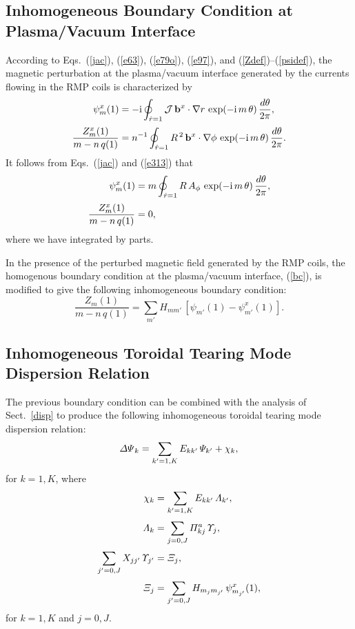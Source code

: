 \documentclass[12pt,prb,aps]{revtex4-1}
\begin{document}
\subsection{Inhomogeneous Boundary Condition at Plasma/Vacuum Interface}
According to Eqs.~(\ref{jac}), (\ref{e63}), (\ref{e79o}), (\ref{e97}), and (\ref{Zdef})--(\ref{psidef}), the magnetic perturbation at the plasma/vacuum
interface generated by the currents flowing in the RMP coils is characterized by
\begin{align}
\psi_m^x(1) &=-{\rm i}\oint_{\hat{r}=1}{\cal J}\,{\bf b}^x\cdot\nabla r\,\exp(-{\rm i}\,m\,\theta)\,\frac{d\theta}{2\pi},\\[0.5ex]
\frac{Z_m^x(1)}{m-n\,q(1)}  &= n^{-1}\oint_{\hat{r}=1}R^{\,2}\,{\bf b}^x\cdot\nabla \phi\,\exp(-{\rm i}\,m\,\theta)\,\frac{d\theta}{2\pi}.
\end{align}
It follows from Eqs.~(\ref{jac}) and (\ref{e313}) that
\begin{align}
\psi_m^x(1) &= m \oint_{\hat{r}=1}R\,A_\phi\,\exp(-{\rm i}\,m\,\theta)\,\frac{d\theta}{2\pi},\\[0.5ex]
\frac{Z_m^x(1)}{m-n\,q(1)}  &= 0,
\end{align}
where we have integrated by parts. 

In the presence of the perturbed magnetic field generated by the RMP coils, the homogenous boundary condition at the plasma/vacuum
interface, (\ref{bc}), is modified to give the following inhomogeneous boundary condition:
\begin{equation}\label{bc1}
\frac{Z_m(1)}{m-n\,q(1)} = \sum_{m'} H_{mm'}\,[\psi_{m'}(1)-\psi_{m'}^x(1)].
\end{equation}

\subsection{Inhomogeneous Toroidal Tearing Mode Dispersion Relation}
The previous boundary condition can be combined with the analysis of Sect.~\ref{disp} to produce the following
inhomogeneous toroidal tearing mode dispersion relation:\,\cite{am3,nelson}
\begin{equation}\label{disp1}
{\mit\Delta\Psi}_k = \sum_{k'=1,K} E_{kk'}\,{\mit\Psi}_{k'} + \chi_k,
\end{equation}
for $k=1,K$, where 
\begin{align}
\chi_k &= \sum_{k'=1,K}E_{kk'}\,{\mit \Lambda}_{k'},\\[0.5ex]
{\mit\Lambda}_{k} &= \sum_{j=0,J} {\mit\Pi}_{kj}^a\,{\mit\Upsilon}_{j},\\[0.5ex]
\sum_{j'=0,J} X_{jj'}\,{\mit\Upsilon}_{j'} &= {\mit\Xi}_{j},\\[0.5ex]
{\mit\Xi}_{j} &= \sum_{j'=0,J} H_{m_j m_{j'}}\,\psi_{m_{j'}}^x(1),
\end{align}
for $k=1,K$ and $j=0,J$. 
\end{document}
